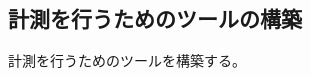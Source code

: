 \documentclass[../../../main]{subfiles}
\begin{document}
    \subsection{計測を行うためのツールの構築}\label{subsec:method-measurement_tool}

    計測を行うためのツールを構築する。
\end{document}
